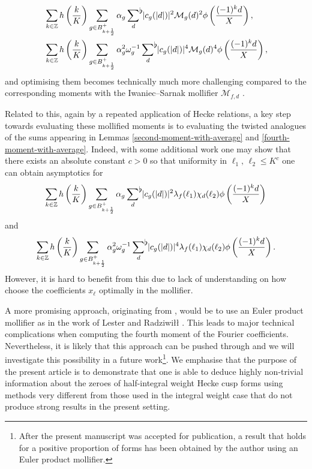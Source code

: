 \documentclass[a4paper,10pt,twoside]{amsart}
\theoremstyle{definition}
\numberwithin{equation}{section}
\newcommand\Z{\mathbb{Z}}
\renewcommand\:{\colon}
\newcommand{\sumflat}{\mathop{{\sum}^{\raisebox{-3pt}{\makebox[0pt][l]{$\flat$}}}}}
\begin{document}
\begin{align*}
&\sum_{k\in\Z}h\left(\frac{k}K\right)\sum_{g\in B^+_{k+\frac12}}\alpha_g\sumflat_{d}\, |c_g(|d|)|^2\mathcal M_{g}(d)^2\phi\left(\frac{(-1)^k d}X\right), \\
& \sum_{k\in\Z}h\left(\frac{k}K\right)\sum_{g\in B^+_{k+\frac12}}\alpha_g^2\omega_g^{-1}\sumflat_{d}\, |c_g(|d|)|^4\mathcal M_{g}(d)^4\phi\left(\frac{(-1)^k d}X\right),
\end{align*}
and optimising them becomes technically much more challenging compared to the corresponding moments with the Iwaniec--Sarnak mollifier $\mathcal M_{f,d}$ \cite{Iwaniec-Sarnak2000}.

Related to this, again by a repeated application of Hecke relations, a key step towards evaluating these mollified moments is to evaluating the twisted analogues of the sums appearing in Lemmas \ref{second-moment-with-average} and \ref{fourth-moment-with-average}. Indeed, with some additional work one may show that there exists an absolute constant $c>0$ so that uniformity in $\ell_1,\,\ell_2\leq K^c$ one can obtain asymptotics for 
\begin{align*}
\sum_{k\in\Z}h\left(\frac{k}K\right)\sum_{g\in B^+_{k+\frac12}}\alpha_g\sumflat_d\, |c_g(|d|)|^2\lambda_f(\ell_1)\chi_d(\ell_2)\phi\left(\frac{(-1)^k d}X\right)
\end{align*}
and 
\begin{align*}
\sum_{k\in\Z}h\left(\frac{k}K\right)\sum_{g\in B^+_{k+\frac12}}\alpha_g^2\omega_g^{-1}\sumflat_{d}\, |c_g(|d|)|^4\lambda_f(\ell_1)\chi_d(\ell_2)\phi\left(\frac{(-1)^k d}X\right).
\end{align*}
However, it is hard to benefit from this due to lack of understanding on how choose the coefficients $x_\ell$ optimally in the mollifier. 

A more promising approach, originating from \cite{Soundararajan2009, Harper2013, Radziwill-Soundararajan2015}, would be to use an Euler product mollifier as in the work of Lester and Radziwi{\l\l} \cite{Lester-Radziwill2021}. This leads to major technical complications when computing the fourth moment of the Fourier coefficients. Nevertheless, it is likely that this approach can be pushed through and we will investigate this possibility in a future work\footnote{After the present manuscript was accepted for publication, a result that holds for a positive proportion of forms has been obtained by the author \cite{Jaasaari2026} using an Euler product mollifier.}. We emphasise that the purpose of the present article is to demonstrate that one is able to deduce highly non-trivial information about the zeroes of half-integral weight Hecke cusp forms using methods very different from those used in the integral weight case that do not produce strong results in the present setting.  
\end{document}
